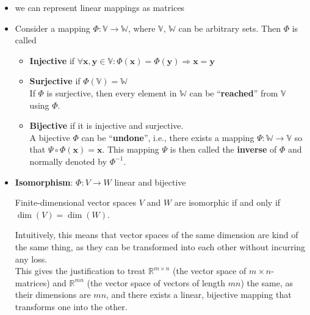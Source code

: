 \begin{itemize}
    \item we can represent linear mappings as matrices
    \item Consider a mapping $\Phi : \mathbb{V} \to \mathbb{W}$, where $\mathbb{V}$, $\mathbb{W}$ can be arbitrary sets. Then $\Phi$ is called
    \begin{itemize}
        \item \textbf{Injective} if $\forall \mathbf{x, y} \in \mathbb{V}: \Phi(\mathbf{x}) = \Phi(\mathbf{y}) \Rightarrow \mathbf{x} = \mathbf{y}$ 

        \item \textbf{Surjective} if $\Phi(\mathbb{V}) = \mathbb{W}$\\
        If $\Phi$ is surjective, then every element in $\mathbb{W}$ can be “\textbf{reached}” from $\mathbb{V}$ using $\Phi$.

        \item \textbf{Bijective} if it is injective and surjective.\\
        A bijective $\Phi$ can be “\textbf{undone}”, i.e., there exists a mapping $\Psi : \mathbb{W} \to \mathbb{V}$ so that $\Psi \circ \Phi(\textbf{x}) = \textbf{x}$. This mapping $\Psi$ is then called the \textbf{inverse} of $\Phi$ and normally denoted by $\Phi^{-1}$.
        
    \end{itemize}

    \item \textbf{Isomorphism}: $\Phi : V \to W$ linear and bijective\\
    
    \begin{theorem}\label{theorem: isomorphic}
        Finite-dimensional vector spaces $V$ and $W$ are isomorphic if and only if $\dim(V) = \dim(W)$.
    \end{theorem}
    
    Intuitively, this means that vector spaces of the same dimension are kind of the same thing, as they can be transformed into each other without incurring any loss.\\
    This gives the justification to treat $\mathbb{R}^{m\times n}$ (the vector space of ${m\times n}$-matrices) and $\mathbb{R}^{mn}$ (the vector space of vectors of length $mn$) the same, as their dimensions are $mn$, and there exists a linear, bijective mapping that transforms one into the other.


\end{itemize}
